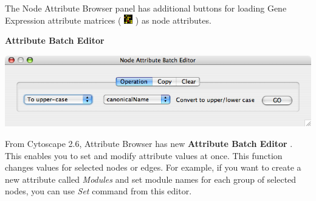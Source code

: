  The Node Attribute Browser panel has additional buttons for loading Gene Expression attribute matrices ( \includegraphics[width=1em]{images/attributes_gene_expr_icon.png}  ) as node attributes. 


 \textbf{Attribute Batch Editor}


 \includegraphics[width=\textwidth]{images/attribute_editor26.png} 


 From Cytoscape 2.6, Attribute Browser has new \textbf{Attribute Batch Editor}
. This enables you to set and modify attribute values at once. This function changes values for selected nodes or edges. For example, if you want to create a new attribute called \emph{Modules}
 and set module names for each group of selected nodes, you can use \emph{Set}
 command from this editor. 
